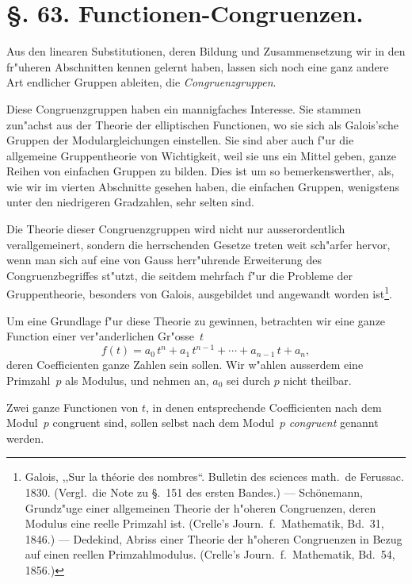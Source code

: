 \documentclass[12pt,a4paper]{article}
\theoremstyle{plain}
\theoremstyle{definition}
\theoremstyle{remark}
\begin{document}
\section*{\S. 63. Functionen-Congruenzen.}

Aus den linearen Substitutionen, deren Bildung und Zusammensetzung wir in den fr"uheren Abschnitten kennen gelernt haben, lassen sich noch eine ganz andere Art endlicher Gruppen ableiten, die \emph{Congruenzgruppen}.

Diese Congruenzgruppen haben ein mannigfaches Interesse. Sie stammen zun"achst aus der Theorie der elliptischen Functionen, wo sie sich als Galois'sche Gruppen der Modulargleichungen einstellen. Sie sind aber auch f"ur die allgemeine Gruppentheorie von Wichtigkeit, weil sie uns ein Mittel geben, ganze Reihen von einfachen Gruppen zu bilden. Dies ist um so bemerkenswerther, als, wie wir im vierten Abschnitte gesehen haben, die einfachen Gruppen, wenigstens unter den niedrigeren Gradzahlen, sehr selten sind.

Die Theorie dieser Congruenzgruppen wird nicht nur ausserordentlich verallgemeinert, sondern die herrschenden Gesetze treten weit sch"arfer hervor, wenn man sich auf eine von Gauss herr"uhrende Erweiterung des Congruenzbegriffes st"utzt, die seitdem mehrfach f"ur die Probleme der Gruppentheorie, besonders von Galois, ausgebildet und angewandt worden ist\footnote{Galois, ,,Sur la th\'eorie des nombres``. Bulletin des sciences math.\ de Ferussac. 1830. (Vergl.\ die Note zu \S.~151 des ersten Bandes.) --- Sch\"onemann, Grundz"uge einer allgemeinen Theorie der h"oheren Congruenzen, deren Modulus eine reelle Primzahl ist. (Crelle's Journ.\ f.\ Mathematik, Bd.~31, 1846.) --- Dedekind, Abriss einer Theorie der h"oheren Congruenzen in Bezug auf einen reellen Primzahlmodulus. (Crelle's Journ.\ f.\ Mathematik, Bd.~54, 1856.)}.

Um eine Grundlage f"ur diese Theorie zu gewinnen, betrachten wir eine ganze Function einer ver"anderlichen Gr"osse~$t$
\begin{equation}\tag{1}
f(t) = a_{0}\,t^{n} + a_{1}\,t^{n-1} + \cdots + a_{n-1}\,t + a_{n},
\end{equation}
deren Coefficienten ganze Zahlen sein sollen. Wir w"ahlen ausserdem eine Primzahl~$p$ als Modulus, und nehmen an, $a_{0}$ sei durch $p$ nicht theilbar.

Zwei ganze Functionen von $t$, in denen entsprechende Coefficienten nach dem Modul~$p$ congruent sind, sollen selbst nach dem Modul~$p$ \emph{congruent} genannt werden.
\end{document}
